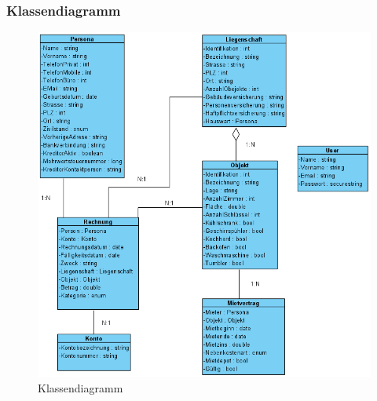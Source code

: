 \subsubsection{Klassendiagramm}
\begin{figure}[htbt]
  \begin{center}
    \includegraphics[width=0.9\linewidth]{content/diagrams/out/classdiagram/classdiagram.png}
    \caption{Klassendiagramm}
    \label{classdiagramm}
  \end{center}
\end{figure}

